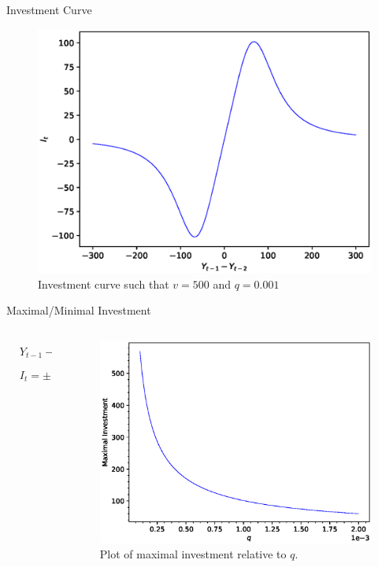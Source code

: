 \documentclass{beamer}
\begin{document}
\begin{frame}{Investment Curve}
	\begin{figure}
		\centering
		\includegraphics[height=0.8\textheight]{investment.eps}
		\caption{Investment curve such that $v=500$ and $q=0.001$}
	\end{figure}
\end{frame}

\begin{frame}{Maximal/Minimal Investment}
	\begin{columns}
	\begin{column}{0.5\textwidth}
		\begin{align*}
			&Y_{t-1}-Y_{t-2} = \pm\frac{q^{1/4}v}{3^{1/4}}\\
			&I_t = \pm\frac{3^{3/4}}{3q^{3/4}}
		\end{align*}
	\end{column}
	\begin{column}{0.5\textwidth}
		\begin{figure}
			\centering
			\includegraphics[width=1.2\textwidth]{maxinvestment.eps}
			\caption{Plot of maximal investment relative to $q$.}
		\end{figure}
	\end{column}
	\end{columns}
\end{frame}
\end{document}
